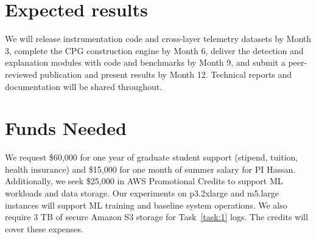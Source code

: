 \section*{Expected results}
We will release instrumentation code and cross-layer telemetry datasets by Month 3, complete the CPG construction engine by Month 6, deliver the detection and explanation modules with code and benchmarks by Month 9, and submit a peer-reviewed publication and present results by Month 12. Technical reports and documentation will be shared throughout.
    
\section*{Funds Needed}

We request \$60,000 for one year of graduate student support (stipend, tuition, health insurance) and \$15,000 for one month of summer salary for PI Hassan. Additionally, we seek \$25,000 in AWS Promotional Credits to support ML workloads and data storage. Our experiments on p3.2xlarge and m5.large instances will support ML training and baseline system operations. We also require 3 TB of secure Amazon S3 storage for Task~\ref{task:1} logs. The credits will cover these expenses.

